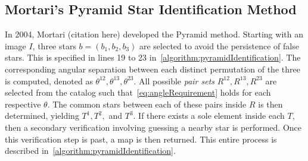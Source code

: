 \subsection{Mortari's Pyramid Star Identification Method}\label{subsec:mortari'sPyramidStarIdentificationMethod}
In 2004, Mortari (citation here) developed the Pyramid method.
Starting with an image $I$, three stars $b = (b_1, b_2, b_3)$ are selected to avoid the persistence of false stars.
This is specified in lines 19 to 23 in~\autoref{algorithm:pyramidIdentification}.
The corresponding angular separation between each distinct permutation of the three is computed, denoted as
$\theta^{12}, \theta^{13}, \theta^{23}$.
All possible \textit{pair sets} $R^{12}, R^{13}, R^{23}$ are selected from the catalog such
that~\autoref{eq:angleRequirement} holds for each respective $\theta$.
The common stars between each of these pairs inside $R$ is then determined, yielding $T^1, T^2, $ and $T^3$.
If there exists a sole element inside each $T$, then a secondary verification involving guessing a nearby star is
performed.
Once this verification step is past, a map is then returned.
This entire process is described in~\autoref{algorithm:pyramidIdentification}.

